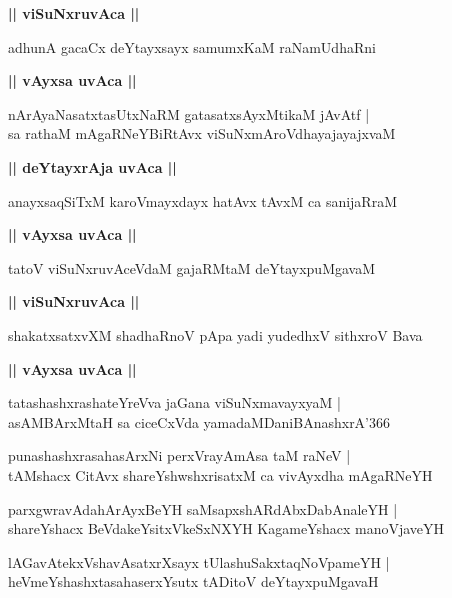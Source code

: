 \documentclass[twoside,12pt,openright]{book}
\newcounter{shloka}[chapter]
\def\uvaca#1{\centerline{{\large\textbf{#1}}}}
\begin{document}
\uvaca{|| viSuNxruvAca ||}

\begin{shloka}%
adhunA gacaCx deYtayxsayx samumxKaM raNamUdhaRni 
\end{shloka}

\uvaca{|| vAyxsa uvAca ||}

\begin{shloka}%
nArAyaNasatxtasUtxNaRM gatasatxsAyxMtikaM jAvAtf |\\
sa rathaM mAgaRNeYBiRtAvx viSuNxmAroVdhayajayajxvaM 
\end{shloka}

\uvaca{|| deYtayxrAja uvAca ||}

\begin{shloka}%
anayxsaqSiTxM karoVmayxdayx hatAvx tAvxM ca sanijaRraM 
\end{shloka}

\uvaca{|| vAyxsa uvAca ||}

\begin{shloka}%
tatoV viSuNxruvAceVdaM gajaRMtaM deYtayxpuMgavaM 
\end{shloka}

\uvaca{|| viSuNxruvAca ||}

\begin{shloka}%
shakatxsatxvXM shadhaRnoV pApa yadi yudedhxV sithxroV Bava
\end{shloka}

\uvaca{|| vAyxsa uvAca ||}

\begin{shloka}%
tatashashxrashateYreVva jaGana viSuNxmavayxyaM |\\
asAMBArxMtaH sa ciceCxVda yamadaMDaniBAnashxrA\char'366
\end{shloka}

\begin{shloka}%
punashashxrasahasArxNi perxVrayAmAsa taM raNeV |\\
tAMshacx CitAvx shareYshwshxrisatxM ca vivAyxdha mAgaRNeYH
\end{shloka}

\begin{shloka}%
parxgwravAdahArAyxBeYH saMsapxshARdAbxDabAnaleYH |\\
shareYshacx BeVdakeYsitxVkeSxNXYH KagameYshacx manoVjaveYH
\end{shloka}

\begin{shloka}%
lAGavAtekxVshavAsatxrXsayx tUlashuSakxtaqNoVpameYH |\\
heVmeYshashxtasahaserxYsutx tADitoV deYtayxpuMgavaH
\end{shloka}
\end{document}
